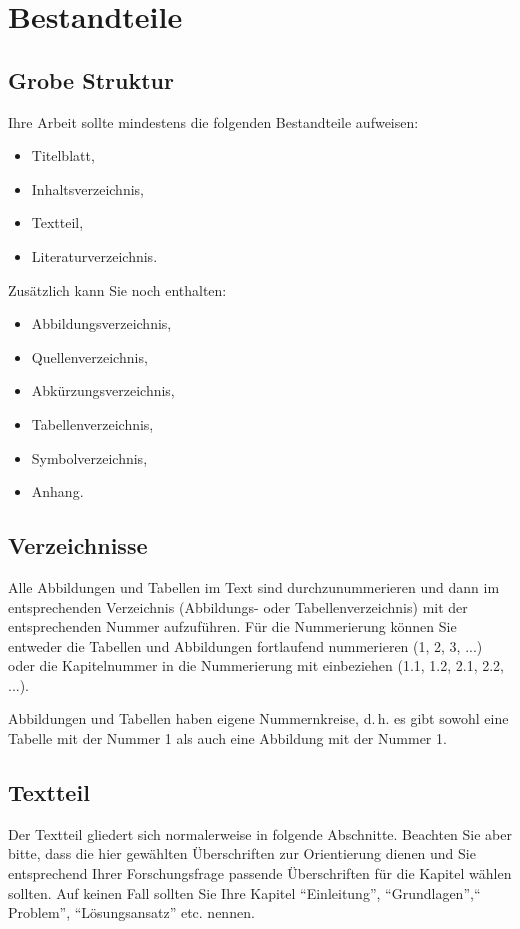 \documentclass[a4paper,11pt,headings=normal]{scrartcl}
\begin{document}
\section{Bestandteile}

\subsection{Grobe Struktur}
Ihre Arbeit sollte mindestens die folgenden Bestandteile aufweisen:

\begin{itemize}
\item Titelblatt,
\item Inhaltsverzeichnis,
\item Textteil,
\item Literaturverzeichnis.
\end{itemize}

Zusätzlich kann Sie noch enthalten:

\begin{itemize}
\item Abbildungsverzeichnis,
\item Quellenverzeichnis,
\item Abkürzungsverzeichnis,
\item Tabellenverzeichnis,
\item Symbolverzeichnis,
\item Anhang.
\end{itemize}

\subsection{Verzeichnisse}
Alle Abbildungen und Tabellen im Text sind durchzunummerieren und dann im entsprechenden Verzeichnis (Abbildungs- oder Tabellenverzeichnis) mit der entsprechenden Nummer aufzuführen. Für die Nummerierung können Sie entweder die Tabellen und Abbildungen fortlaufend nummerieren (1, 2, 3, ...) oder die Kapitelnummer in die Nummerierung mit einbeziehen (1.1, 1.2, 2.1, 2.2, ...).

Abbildungen und Tabellen haben eigene Nummernkreise, d.\,h. es gibt sowohl eine Tabelle mit der Nummer 1 als auch eine Abbildung mit der Nummer 1.

\subsection{Textteil}
Der Textteil gliedert sich normalerweise in folgende Abschnitte. Beachten Sie aber bitte, dass die hier gewählten Überschriften zur Orientierung dienen und Sie entsprechend Ihrer Forschungsfrage passende Überschriften für die Kapitel wählen sollten. Auf keinen Fall sollten Sie Ihre Kapitel "`Einleitung"', "`Grundlagen"',"` Problem"', "`Lösungsansatz"' etc. nennen.
\end{document}
